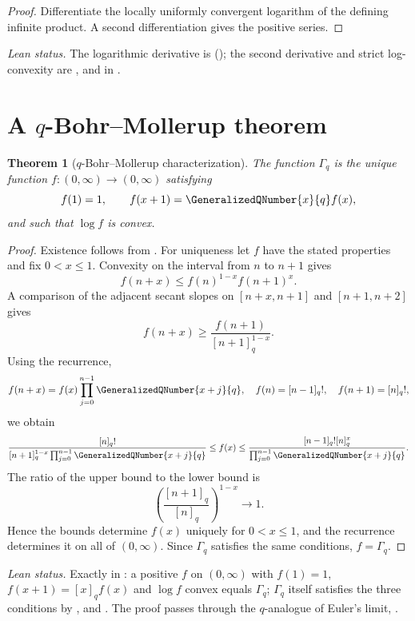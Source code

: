 \documentclass[11pt,a4paper,oneside,openany]{book}
\newtheorem{theorem}{Theorem}[chapter]
\theoremstyle{definition}
\theoremstyle{remark}
\begin{document}
\begin{proof}
Differentiate the locally uniformly convergent logarithm of the defining infinite product.  A second differentiation gives the positive series.
\end{proof}

\emph{Lean status.}  The logarithmic derivative is 
(); the second derivative and strict log-convexity are
,  and
 in .


\section{A \texorpdfstring{$q$}{q}-Bohr--Mollerup theorem}

\begin{theorem}[$q$-Bohr--Mollerup characterization]\label{thm:q-bohr-mollerup}
The function $\Gamma_q$ is the unique function $f:(0,\infty)\to(0,\infty)$ satisfying
\[
 f(1)=1,
 \qquad
 f(x+1)=\GeneralizedQNumber{x}{q}f(x),
\]
and such that $\log f$ is convex.
\end{theorem}

\begin{proof}
Existence follows from .  For uniqueness let $f$ have the stated properties and fix $0<x\le1$.  Convexity on the interval from $n$ to $n+1$ gives
\[
 f(n+x)\le f(n)^{1-x}f(n+1)^x.
\]
A comparison of the adjacent secant slopes on $[n+x,n+1]$ and $[n+1,n+2]$ gives
\[
 f(n+x)\ge\frac{f(n+1)}{[n+1]_q^{1-x}}.
\]
Using the recurrence,
\[
 f(n+x)=f(x)\prod_{j=0}^{n-1}\GeneralizedQNumber{x+j}{q},
 \quad
 f(n)=[n-1]_q!,
 \quad
 f(n+1)=[n]_q!,
\]
we obtain
\[
 \frac{[n]_q!}
 {[n+1]_q^{1-x}\prod_{j=0}^{n-1}\GeneralizedQNumber{x+j}{q}}
 \le f(x)\le
 \frac{[n-1]_q![n]_q^x}
 {\prod_{j=0}^{n-1}\GeneralizedQNumber{x+j}{q}}.
\]
The ratio of the upper bound to the lower bound is
\[
 \left(\frac{[n+1]_q}{[n]_q}\right)^{1-x}\longrightarrow1.
\]
Hence the bounds determine $f(x)$ uniquely for $0<x\le1$, and the recurrence determines it on all of $(0,\infty)$.  Since $\Gamma_q$ satisfies the same conditions, $f=\Gamma_q$.
\end{proof}

\emph{Lean status.}  Exactly  in
: a positive $f$ on $(0,\infty)$ with $f(1)=1$,
$f(x+1)=[x]_q f(x)$ and $\log f$ convex equals $\Gamma_q$; $\Gamma_q$ itself satisfies the
three conditions by ,  and
.  The proof passes through the $q$-analogue of
Euler's limit, .
\end{document}
